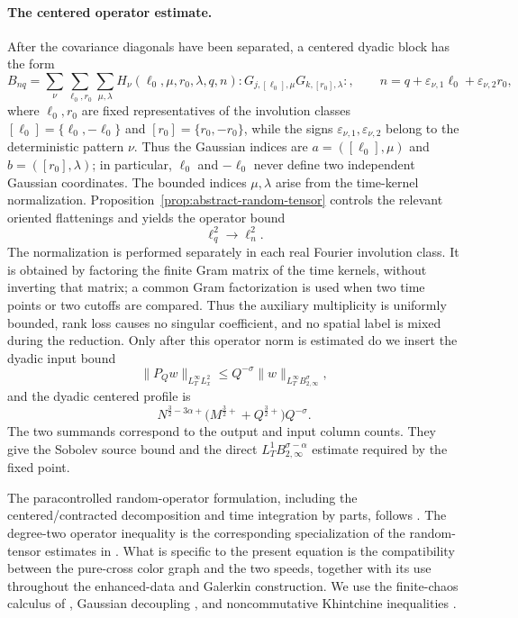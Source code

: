 \documentclass[10pt]{amsart}
\numberwithin{equation}{section}
\theoremstyle{plain}
\theoremstyle{definition}
\theoremstyle{remark}
\begin{document}
\paragraph{The centered operator estimate.}
After the covariance diagonals have been separated, a centered dyadic block has the form
\[
        B_{nq}=\sum_{\nu}\sum_{\ell_0,r_0}\sum_{\mu,\lambda}
        H_\nu(\ell_0,\mu,r_0,\lambda,q,n)
        :G_{j,[\ell_0],\mu}G_{k,[r_0],\lambda}:,
        \qquad
        n=q+\varepsilon_{\nu,1}\ell_0+\varepsilon_{\nu,2}r_0,
\]
where \(\ell_0,r_0\) are fixed representatives of the involution classes \([\ell_0]=\{\ell_0,-\ell_0\}\) and \([r_0]=\{r_0,-r_0\}\), while the signs \(\varepsilon_{\nu,1},\varepsilon_{\nu,2}\) belong to the deterministic pattern \(\nu\).  Thus the Gaussian indices are \(a=([\ell_0],\mu)\) and \(b=([r_0],\lambda)\); in particular, \(\ell_0\) and \(-\ell_0\) never define two independent Gaussian coordinates.  The bounded indices \(\mu,\lambda\) arise from the time-kernel normalization.  Proposition~\ref{prop:abstract-random-tensor} controls the relevant oriented flattenings and yields the operator bound
\[
        \ell_q^2\longrightarrow \ell_n^2.
\]
The normalization is performed separately in each real Fourier involution class.  It is obtained by factoring the finite Gram matrix of the time kernels, without inverting that matrix; a common Gram factorization is used when two time points or two cutoffs are compared.  Thus the auxiliary multiplicity is uniformly bounded, rank loss causes no singular coefficient, and no spatial label is mixed during the reduction.
Only after this operator norm is estimated do we insert the dyadic input bound
\begin{equation}\label{eq:intro-positive-envelope}
        \|P_Qw\|_{L_T^\infty L_x^2}
        \le Q^{-\sigma}\|w\|_{L_T^\infty B_{2,\infty}^\sigma},
\end{equation}
and the dyadic centered profile is
\begin{equation}\label{eq:intro-centered-profile}
        N^{\frac32-3\alpha+}\bigl(M^{\frac32+}+Q^{\frac32+}\bigr)Q^{-\sigma}.
\end{equation}
The two summands correspond to the output and input column counts.  They give the Sobolev source bound and the direct \(L_T^1B_{2,\infty}^{\sigma-\alpha}\) estimate required by the fixed point.

The paracontrolled random-operator formulation, including the centered/contracted decomposition and time integration by parts, follows \cite{GKO}.  The degree-two operator inequality is the corresponding specialization of the random-tensor estimates in \cite{DNY,Kaneshiro}.  What is specific to the present equation is the compatibility between the pure-cross color graph and the two speeds, together with its use throughout the enhanced-data and Galerkin construction.  We use the finite-chaos calculus of \cite{Janson,Nualart,PeccatiTaqqu}, Gaussian decoupling \cite{DeLaPenaGine}, and noncommutative Khintchine inequalities \cite{LustPisier}.
\end{document}
